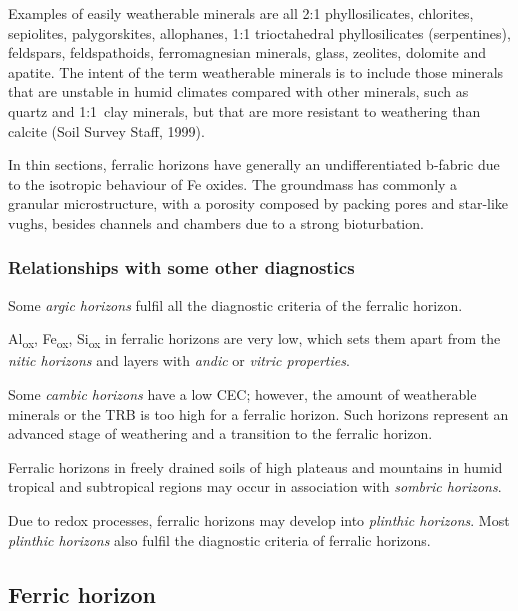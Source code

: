 \documentclass[
  letterpaper,
  DIV=11,
  numbers=noendperiod]{scrreprt}
\begin{document}
Examples of easily weatherable minerals are all 2:1 phyllosilicates,
chlorites, sepiolites, palygorskites, allophanes, 1:1 trioctahedral
phyllosilicates (serpentines), feldspars, feldspathoids, ferromagnesian
minerals, glass, zeolites, dolomite and apatite. The intent of the term
weatherable minerals is to include those minerals that are unstable in
humid climates compared with other minerals, such as quartz and 1:1~clay
minerals, but that are more resistant to weathering than calcite (Soil
Survey Staff, 1999).

In thin sections, ferralic horizons have generally an undifferentiated
b-fabric due to the isotropic behaviour of Fe oxides. The groundmass has
commonly a granular microstructure, with a porosity composed by packing
pores and star-like vughs, besides channels and chambers due to a strong
bioturbation.

\hypertarget{relationships-with-some-other-diagnostics-9}{%
\subsubsection{Relationships with some other
diagnostics}\label{relationships-with-some-other-diagnostics-9}}

Some \emph{argic horizons} fulfil all the diagnostic criteria of the
ferralic horizon.

Al\textsubscript{ox}, Fe\textsubscript{ox}, Si\textsubscript{ox} in
ferralic horizons are very low, which sets them apart from the
\emph{nitic horizons} and layers with \emph{andic} or \emph{vitric
properties}.

Some \emph{cambic horizons} have a low CEC; however, the amount of
weatherable minerals or the TRB is too high for a ferralic horizon. Such
horizons represent an advanced stage of weathering and a transition to
the ferralic horizon.

Ferralic horizons in freely drained soils of high plateaus and mountains
in humid tropical and subtropical regions may occur in association with
\emph{sombric horizons}.

Due to redox processes, ferralic horizons may develop into
\emph{plinthic horizons}. Most \emph{plinthic horizons} also fulfil the
diagnostic criteria of ferralic horizons.

\hypertarget{ferric-horizon}{%
\subsection{Ferric horizon}\label{ferric-horizon}}
\end{document}
